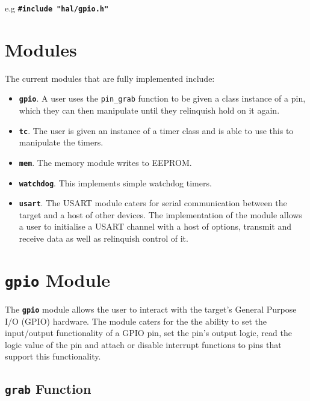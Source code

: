\documentclass[a4paper, oneside, 11pt, titlepage, onecolumn, openright]{report}
\begin{document}
e.g \textbf{\texttt{\#include "hal/gpio.h"}}
			
			\section{Modules}
				\label{s:Hardware Abstraction Libraries:Modules}
	
				The current modules that are fully implemented include:
			
				\begin{itemize}

					\item \textbf{\texttt{gpio}}. A user uses the \texttt{pin\_grab} function to be given a class instance of a pin, which they can then manipulate until they relinquish hold on it again. 

					\item \textbf{\texttt{tc}}. The user is given an instance of a timer class and is able to use this to manipulate the timers. 
					
					\item \textbf{\texttt{mem}}. The memory module writes to EEPROM. 

					\item \textbf{\texttt{watchdog}}. This implements simple watchdog timers.

					\item \textbf{\texttt{usart}}. The USART module caters for serial communication between the target and a host of other devices. The implementation of the module allows a user to initialise a USART channel with a host of options, transmit and receive data as well as relinquish control of it.
			
				\end{itemize}

			\section{\textbf{\texttt{gpio}} Module}
				\label{s:Hardware Abstraction Libraries:gpio Module}
				
				The \textbf{\texttt{gpio}} module allows the user to interact with the target's General Purpose I/O (GPIO) hardware. The module caters for the the ability to set the input/output functionality of a GPIO pin, set the pin's output logic, read the logic value of the pin and attach or disable interrupt functions to pins that support this functionality.

				\subsection{\textbf{\texttt{grab}} Function}
					\label{ss:Hardware Abstraction Libraries:gpio Module:grab Function}
		
\end{document}
